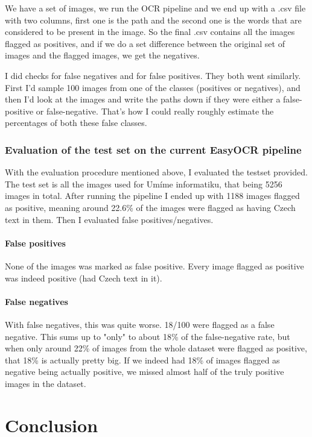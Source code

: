 \documentclass[
  digital,     %
  oneside,     %
  nosansbold,  %
  nocolorbold, %
  nolof,         %
  nolot,         %
]{fithesis4}
\begin{document}
We have a set of images, we run the OCR pipeline and we end up with a .csv file with two columns, first one is the path and the second one is the words that are considered to be present in the image. So the final .csv contains all the images flagged as positives, and if we do a set difference between the original set of images and the flagged images, we get the negatives.

I did checks for false negatives and for false positives. They both went similarly. First I'd sample 100 images from one of the classes (positives or negatives), and then I'd look at the images and write the paths down if they were either a false-positive or false-negative. That's how I could really roughly estimate the percentages of both these false classes.

\subsection{Evaluation of the test set on the current EasyOCR pipeline}

With the evaluation procedure mentioned above, I evaluated the testset provided. The test set is all the images used for Umíme informatiku, that being 5256 images in total. After running the pipeline I ended up with 1188 images flagged as positive, meaning around 22.6\% of the images were flagged as having Czech text in them.
Then I evaluated false positives/negatives.

\subsubsection{False positives}
None of the images was marked as false positive. Every image flagged as positive was indeed positive (had Czech text in it).

\subsubsection{False negatives}
With false negatives, this was quite worse. 18/100 were flagged as a false negative. This sums up to "only" to about 18\% of the false-negative rate, but when only around 22\% of images from the whole dataset were flagged as positive, that 18\% is actually pretty big. If we indeed had 18\% of images flagged as negative being actually positive, we missed almost half of the truly positive images in the dataset.

\chapter{Conclusion}
\end{document}
